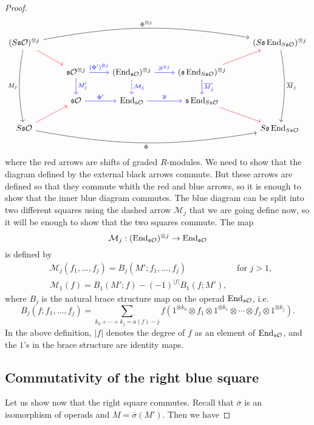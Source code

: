 \documentclass[twoside]{article}
\begin{document}
\begin{proof}
\[
\begin{tikzcd}
(S\s\OO)^{\otimes j}\arrow[dr,red] \arrow[ddd, bend right=10,"M_j"']\arrow[rrrr,bend left=10, "\Phi^{\otimes j}"]& & & & (S\s\End_{S\s\OO})^{\otimes j}\arrow[ddd, bend left=10, "\overline{M}_j"]\\
&\s\OO^{\otimes j}\arrow[r,blue, "(\Phi')^{\otimes j}"]\arrow[d, blue, "M'_j"] & (\End_{\s\OO})^{\otimes j}\arrow[r, blue,"\overline{\sigma}^{\otimes j}"] \arrow[d, dashed, "\mathcal{M}_j",blue]& (\s\End_{S\s\OO})^{\otimes j}\arrow[ur,red]\arrow[d, "\overline{M}'_j",blue]& \\
&\s\OO\arrow[r, blue, "\Phi'"]& \End_{\s\OO} \arrow[r, blue, "\overline{\sigma}"] & \s\End_{S\s\OO}\arrow[dr,red]& \\
S\s\OO\arrow[rrrr, bend right=10, "\Phi"']\arrow[ur,red]& & & & S\s\End_{S\s\OO}
\end{tikzcd}
\]
where the red arrows are shifts of graded $R$-modules. We need to show that the diagram defined by the external black arrows commute. But these arrows are defined so that they commute whith the red and blue arrows, so it is enough to show that the inner blue diagram commutes. The blue diagram can be split into two different squares using the dashed arrow $\mathcal{M}_j$ that we are going define now, so it will be enough to show that the two squares commute. The map 
\[\mathcal{M}_j:(\operatorname{End}_{\mathfrak{s}{\mathcal O}})^{\otimes j}\to\operatorname{End}_{\mathfrak{s}{\mathcal O}}\]
is defined by 
\begin{align*}
&\mathcal{M}_j(f_1, \dots, f_j)=B_j(M';f_1,\dots, f_j) &\text{ for }j>1,\\
&\mathcal{M}_1(f)=B_1(M';f)-(-1)^{|f|}B_1(f;M'),
\end{align*}
 where $B_j$ is the natural brace structure map on the operad $\operatorname{End}_{\mathfrak{s}{\mathcal O}}$, i.e. 
\[B_j(f;f_1,\dots, f_j)=\sum_{k_0+\cdots+k_j=a(f)-j} f(1^{\otimes k_0}\otimes f_1\otimes 1^{\otimes k_1}\otimes\cdots\otimes f_j\otimes 1^{\otimes k_j}).\]
 In the above definition, $|f|$ denotes the degree of $f$ as an element of $\operatorname{End}_{\mathfrak{s}{\mathcal O}}$, and the $1$'s in the brace structure are identity maps. %
 \subsection{Commutativity of the right blue square}
 Let us show now that the right square commutes. Recall that $\overline{\sigma}$ is an isomorphism of operads and $M=\overline{\sigma}(M')$. Then we have 
 

\end{proof}
\end{document}
